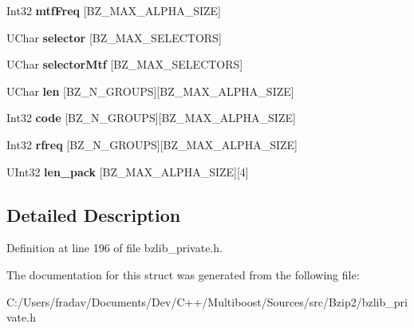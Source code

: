 \begin{DoxyCompactItemize}
\item 
\hypertarget{structEState_a0fa38a2a57e2a040fb71fda8fdef5894}{Int32 {\bfseries mtf\-Freq} \mbox{[}B\-Z\-\_\-\-M\-A\-X\-\_\-\-A\-L\-P\-H\-A\-\_\-\-S\-I\-Z\-E\mbox{]}}\label{structEState_a0fa38a2a57e2a040fb71fda8fdef5894}

\item 
\hypertarget{structEState_a0bd78fee5e462a5fd92ccb6eee6eaf38}{U\-Char {\bfseries selector} \mbox{[}B\-Z\-\_\-\-M\-A\-X\-\_\-\-S\-E\-L\-E\-C\-T\-O\-R\-S\mbox{]}}\label{structEState_a0bd78fee5e462a5fd92ccb6eee6eaf38}

\item 
\hypertarget{structEState_a67428eed73074a40558aa653a3f21d86}{U\-Char {\bfseries selector\-Mtf} \mbox{[}B\-Z\-\_\-\-M\-A\-X\-\_\-\-S\-E\-L\-E\-C\-T\-O\-R\-S\mbox{]}}\label{structEState_a67428eed73074a40558aa653a3f21d86}

\item 
\hypertarget{structEState_aa5f9af18cdba3dac5c071b915446c8c5}{U\-Char {\bfseries len} \mbox{[}B\-Z\-\_\-\-N\-\_\-\-G\-R\-O\-U\-P\-S\mbox{]}\mbox{[}B\-Z\-\_\-\-M\-A\-X\-\_\-\-A\-L\-P\-H\-A\-\_\-\-S\-I\-Z\-E\mbox{]}}\label{structEState_aa5f9af18cdba3dac5c071b915446c8c5}

\item 
\hypertarget{structEState_a138b520fed9d5bbb10d830f1f4e4dab1}{Int32 {\bfseries code} \mbox{[}B\-Z\-\_\-\-N\-\_\-\-G\-R\-O\-U\-P\-S\mbox{]}\mbox{[}B\-Z\-\_\-\-M\-A\-X\-\_\-\-A\-L\-P\-H\-A\-\_\-\-S\-I\-Z\-E\mbox{]}}\label{structEState_a138b520fed9d5bbb10d830f1f4e4dab1}

\item 
\hypertarget{structEState_a9a925e22f64a78c4a1080c66ffa0ef62}{Int32 {\bfseries rfreq} \mbox{[}B\-Z\-\_\-\-N\-\_\-\-G\-R\-O\-U\-P\-S\mbox{]}\mbox{[}B\-Z\-\_\-\-M\-A\-X\-\_\-\-A\-L\-P\-H\-A\-\_\-\-S\-I\-Z\-E\mbox{]}}\label{structEState_a9a925e22f64a78c4a1080c66ffa0ef62}

\item 
\hypertarget{structEState_a2ab0ad3f8a3bb1b6e03977a26c2b64af}{U\-Int32 {\bfseries len\-\_\-pack} \mbox{[}B\-Z\-\_\-\-M\-A\-X\-\_\-\-A\-L\-P\-H\-A\-\_\-\-S\-I\-Z\-E\mbox{]}\mbox{[}4\mbox{]}}\label{structEState_a2ab0ad3f8a3bb1b6e03977a26c2b64af}

\end{DoxyCompactItemize}


\subsection{Detailed Description}


Definition at line 196 of file bzlib\-\_\-private.\-h.



The documentation for this struct was generated from the following file\-:\begin{DoxyCompactItemize}
\item 
C\-:/\-Users/fradav/\-Documents/\-Dev/\-C++/\-Multiboost/\-Sources/src/\-Bzip2/bzlib\-\_\-private.\-h\end{DoxyCompactItemize}
